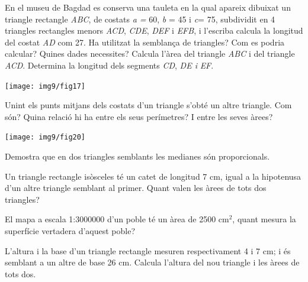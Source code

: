 \begin{activitats}
\begin{mylist}
\exer 
	En el museu de Bagdad es conserva una tauleta en la qual apareix dibuixat un triangle rectangle \textit{ABC}, de costats \textit{a =} 60, \textit{b} = 45 i \textit{c}= 75, subdividit en 4 triangles rectangles menors \textit{ACD}, \textit{CDE}, \textit{DEF} i \textit{EFB}, i l'escriba calcula la longitud del costat \textit{AD} com 27. Ha utilitzat la semblança de triangles? Com es podria calcular? Quines dades necessites? Calcula l'àrea del triangle \textit{ABC} i del triangle \textit{ACD}. Determina la longitud dels segments \textit{CD}, \textit{DE i}  \textit{EF}. 
 
\begin{center}
	\texttt{[image: img9/fig17]}
\end{center}
 
 
 \exer  Unint els punts mitjans dels costats d'un triangle s'obté un altre triangle. Com són? Quina relació hi ha entre els seus perímetres? I entre les seves àrees?
 
 \begin{center}
 	\texttt{[image: img9/fig20]}
 \end{center}


\exer  Demostra que en dos triangles semblants les medianes són proporcionals. 


\exer  Un triangle rectangle isòsceles té un catet de longitud 7 cm, igual a la hipotenusa d'un altre triangle semblant al primer. Quant valen les àrees de tots dos triangles?


\exer  El mapa a escala 1:3000000 d'un poble té un àrea de 2500 cm${}^{2}$, quant mesura la superfície vertadera d'aquest poble?


\exer  L'altura i la base d'un triangle rectangle mesuren respectivament 4 i 7 cm; i és semblant a un altre de base 26 cm. Calcula l'altura del nou triangle i les àrees de tots dos.



\end{mylist}
\end{activitats}
